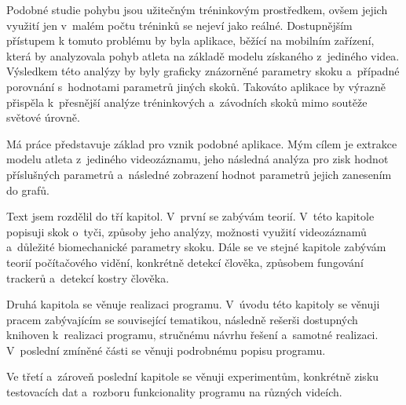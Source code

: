Podobné studie pohybu jsou užitečným tréninkovým prostředkem, ovšem jejich využití jen v~malém počtu tréninků se nejeví jako reálné. Dostupnějším přístupem k tomuto problému by byla aplikace, běžící na mobilním zařízení, která by analyzovala pohyb atleta na základě modelu získaného z~jediného videa. Výsledkem této analýzy by byly graficky znázorněné parametry skoku a~případné porovnání s~hodnotami parametrů jiných skoků. Takováto aplikace by výrazně přispěla k~přesnější analýze tréninkových a~závodních skoků mimo soutěže světové úrovně.

Má práce představuje základ pro vznik podobné aplikace. Mým cílem je extrakce modelu atleta z~jediného videozáznamu, jeho následná analýza pro zisk hodnot příslušných parametrů a~následné zobrazení hodnot parametrů jejich zanesením do grafů.

Text jsem rozdělil do tří kapitol. V~první se zabývám teorií. V~této kapitole popisuji skok o~tyči, způsoby jeho analýzy, možnosti využití videozáznamů a~důležité biomechanické parametry skoku. Dále se ve stejné kapitole zabývám teorií počítačového vidění, konkrétně detekcí člověka, způsobem fungování trackerů a~detekcí kostry člověka.

Druhá kapitola se věnuje realizaci programu. V~úvodu této kapitoly se věnuji pracem zabývajícím se související tematikou, následně rešerši dostupných knihoven k~realizaci programu, stručnému návrhu řešení a~samotné realizaci. V~poslední zmíněné části se věnuji podrobnému popisu programu.

Ve třetí a~zároveň poslední kapitole se věnuji experimentům, konkrétně zisku testovacích dat a~rozboru funkcionality programu na různých videích.